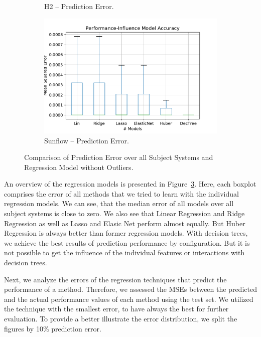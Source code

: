 \begin{figure}[h]
\begin{subfigure}{.49\textwidth}
	  \caption{H2 -- Prediction Error.}
	  \label{box_model_cross_comp_h2}
	\end{subfigure}
	\begin{subfigure}{.49\textwidth}
	  \centering
	  \includegraphics[width=\textwidth]{images/Sunflow_box_regression_model_overview_without_outl}
	  \caption{Sunflow -- Prediction Error.}
	  \label{box_model_cross_comp_sunflow}
	\end{subfigure}
	\caption{Comparison of Prediction Error over all Subject Systems and Regression Model without Outliers.}
	\label{fig:regression_model_error_comparison}
\end{figure}

An overview of the regression models is presented in Figure~\ref{fig:regression_model_error_comparison}. Here, each boxplot comprises the error of all methods that we tried to learn with the individual regression models. We can see, that the median error of all models over all subject systems is close to zero. We also see that Linear Regression and Ridge Regression as well as Lasso and Elasic Net perform almost equally. But Huber Regression is always better than former regression models. With decision trees, we achieve the best results of prediction performance by configuration. But it is not possible to get the influence of the individual features or interactions with decision trees.


Next, we analyze the errors of the regression techniques that predict the performance of a method. Therefore, we assessed the \acp{MSE} between the predicted and the actual performance values of each method using the test set. We utilized the technique with the smallest error, to have always the best for further evaluation. To provide a better illustrate the error distribution, we split the figures by 10\% prediction error.

